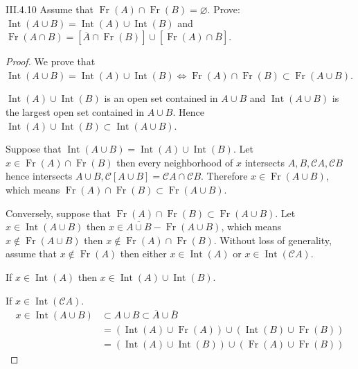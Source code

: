 \begin{problem}{III.4.10}
Assume that \( \operatorname{Fr}(A) \cap \operatorname{Fr}(B) = \varnothing \). Prove: \( \operatorname{Int}(A \cup B) = \operatorname{Int}(A) \cup \operatorname{Int}(B) \) and \( \operatorname{Fr}(A \cap B) = \left[ \overline{A} \cap \operatorname{Fr}(B) \right] \cup \left[ \operatorname{Fr}(A) \cap \overline{B} \right] \).
\end{problem}

\begin{proof}
	We prove that \( \operatorname{Int}(A \cup B) = \operatorname{Int}(A) \cup \operatorname{Int}(B) \iff \operatorname{Fr}(A) \cap \operatorname{Fr}(B) \subset \operatorname{Fr}(A \cup B) \).

	\( \operatorname{Int}(A) \cup \operatorname{Int}(B) \) is an open set contained in \( A \cup B \) and \( \operatorname{Int}(A \cup B) \) is the largest open set contained in \( A \cup B \). Hence \( \operatorname{Int}(A) \cup \operatorname{Int}(B) \subset \operatorname{Int}(A \cup B) \).

	Suppose that \( \operatorname{Int}(A \cup B) = \operatorname{Int}(A) \cup \operatorname{Int}(B) \). Let \( x \in \operatorname{Fr}(A) \cap \operatorname{Fr}(B) \) then every neighborhood of \( x \) intersects \( A, B, \mathscr{C}A, \mathscr{C}B \) hence intersects \( A \cup B, \mathscr{C}\left[A \cup B\right] = \mathscr{C}A \cap \mathscr{C}B \). Therefore \( x \in \operatorname{Fr}(A \cup B) \), which means \( \operatorname{Fr}(A) \cap \operatorname{Fr}(B) \subset \operatorname{Fr}(A \cup B) \).

	Conversely, suppose that \( \operatorname{Fr}(A) \cap \operatorname{Fr}(B) \subset \operatorname{Fr}(A \cup B) \). Let \( x \in \operatorname{Int}(A \cup B) \) then \( x \in \overline{A \cup B} - \operatorname{Fr}(A \cup B) \), which means \( x \notin \operatorname{Fr}(A \cup B) \) then \( x \notin \operatorname{Fr}(A) \cap \operatorname{Fr}(B) \). Without loss of generality, assume that \( x \notin \operatorname{Fr}(A) \) then either \( x \in \operatorname{Int}(A) \) or \( x \in \operatorname{Int}(\mathscr{C}A) \).

	If \( x \in \operatorname{Int}(A) \) then \( x \in \operatorname{Int}(A) \cup \operatorname{Int}(B) \).

	If \( x \in \operatorname{Int}(\mathscr{C}A) \).
	\begingroup
	\allowdisplaybreaks%
	\begin{align*}
		x \in \operatorname{Int}(A \cup B) & \subset A \cup B \subset \overline{A} \cup \overline{B}                                                                          \\
		                                   & = \left(\operatorname{Int}(A) \cup \operatorname{Fr}(A)\right) \cup \left(\operatorname{Int}(B) \cup \operatorname{Fr}(B)\right) \\
		                                   & = \left(\operatorname{Int}(A) \cup \operatorname{Int}(B)\right) \cup \left(\operatorname{Fr}(A) \cup \operatorname{Fr}(B)\right)
	\end{align*}
	\endgroup


\end{proof}

